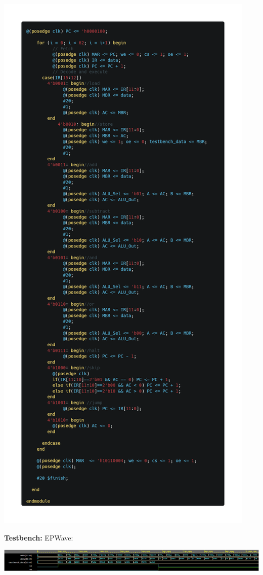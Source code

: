 \documentclass[12pt]{article}
\begin{document}
\begin{center}
    \includegraphics[scale=0.4]{images/design1_2.png}
\end{center}
\pagebreak
\textbf{Testbench:}
EPWave:
\begin{center}
    \includegraphics[width=\linewidth]{images/design1a_wave.png}
\end{center}
\end{document}
